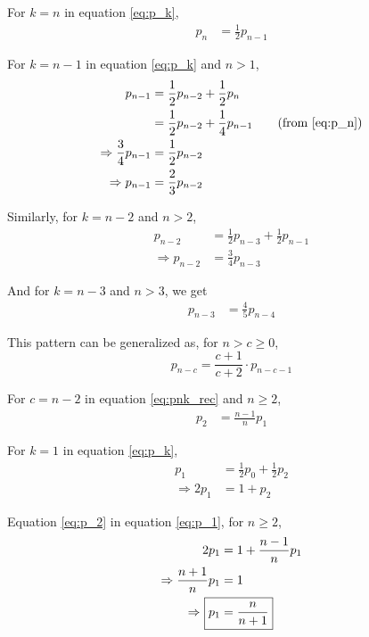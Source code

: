 \documentclass[11pt,a4paper,titlepage]{article}
\begin{document}
For $k = n$ in equation \ref{eq:p_k},
\begin{align}
    p_n &= \frac{1}{2} p_{n-1} \label{eq:p_n}
\end{align}

For $k = n - 1$ in equation \ref{eq:p_k} and $n > 1$,
\begin{align*}
    p_{n-1} &= \frac{1}{2} p_{n-2} + \frac{1}{2} p_n \\
            &= \frac{1}{2} p_{n-2} + \frac{1}{4} p_{n-1} \tag{from \ref{eq:p_n}} \\
    \Rightarrow \frac{3}{4} p_{n-1} &= \frac{1}{2} p_{n-2} \\
    \Rightarrow p_{n-1} &= \frac{2}{3} p_{n-2}
\end{align*}

Similarly, for $k = n - 2$ and $n > 2$,
\begin{align*}
    p_{n-2} &= \frac{1}{2} p_{n-3} + \frac{1}{2} p_{n-1} \\
    \Rightarrow p_{n-2} &= \frac{3}{4} p_{n-3}
\end{align*}

And for $k = n - 3$ and $n > 3$, we get
\begin{align*}
    p_{n-3} &= \frac{4}{5} p_{n-4}
\end{align*}

This pattern can be generalized as, for $n > c \ge 0$,
\begin{equation}\label{eq:pnk_rec}
    p_{n-c} = \frac{c + 1}{c + 2} \cdot p_{n-c-1}
\end{equation}

For $c = n - 2$ in equation \ref{eq:pnk_rec} and $n \ge 2$,
\begin{align}
    p_2 &= \frac{n - 1}{n} p_1 \label{eq:p_2}
\end{align}

For $k = 1$ in equation \ref{eq:p_k},
\begin{align}
    p_1 &= \frac{1}{2} p_0 + \frac{1}{2} p_2 \nonumber \\
    \Rightarrow 2 p_1 &= 1 + p_2 \label{eq:p_1}
\end{align}

Equation \ref{eq:p_2} in equation \ref{eq:p_1}, for $n \ge 2$,
\begin{align*}
    2p_1 &= 1 + \frac{n - 1}{n} p_1 \\
    \Rightarrow \frac{n + 1}{n} p_1 &= 1 \\
    \Rightarrow~\Aboxed{p_1 &= \frac{n}{n + 1}}
\end{align*}
\end{document}
